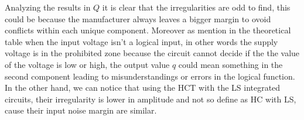     \pagebreak

	Analyzing the results in $Q$ it is clear that the irregularities are odd to find, this could be because the manufacturer always leaves a bigger margin to ovoid conflicts within each unique component. Moreover as mention in the theoretical table when the input voltage isn't a logical input, in other words the supply voltage is in the prohibited zone because the circuit cannot decide if the the value of the voltage is low or high, the output value $q$ could mean something in the second component leading to misunderstandings or errors in the logical function. In the other hand, we can notice that using the HCT with the LS integrated circuits, their irregularity is lower in amplitude and not so define as HC with LS, cause their input noise margin are similar. 

%